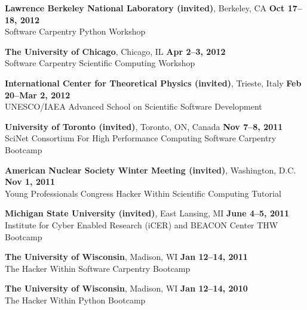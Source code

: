 \documentclass[margin,line]{resume}
\begin{document}
\begin{resume}
    \textbf{Lawrence Berkeley National Laboratory (invited)}, Berkeley, CA \hfill \textbf{Oct 17--18, 2012}\\
    Software Carpentry Python Workshop

    \textbf{The University of Chicago}, Chicago, IL \hfill \textbf{Apr 2--3, 2012}\\
    Software Carpentry Scientific Computing Workshop

    \textbf{International Center for Theoretical Physics (invited)}, Trieste, Italy \hfill \textbf{Feb 20--Mar 2, 2012}\\
    UNESCO/IAEA Advanced School on Scientific Software Development

    \textbf{University of Toronto (invited)}, Toronto, ON, Canada \hfill \textbf{Nov 7--8, 2011}\\
      SciNet Consortium For High Performance Computing Software Carpentry Bootcamp

    \textbf{American Nuclear Society Winter Meeting (invited)}, Washington, D.C.  \hfill \textbf{Nov 1, 2011}\\
    Young Professionals Congress Hacker Within Scientific Computing Tutorial

    \textbf{Michigan State University (invited)}, East Lansing, MI \hfill \textbf{June 4--5, 2011}\\
     Institute for Cyber Enabled Research (iCER) and BEACON Center THW Bootcamp

    \textbf{The University of Wisconsin}, Madison, WI \hfill\textbf{Jan 12--14, 2011}\\
    The Hacker Within Software Carpentry Bootcamp

    \textbf{The University of Wisconsin}, Madison, WI \hfill \textbf{Jan 12--14, 2010}\\
    The Hacker Within Python Bootcamp


\end{resume}
\end{document}
